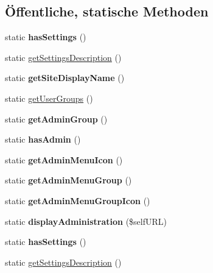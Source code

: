 \subsection*{Öffentliche, statische Methoden}
\begin{DoxyCompactItemize}
\item 
\mbox{\label{classdokumente_a0eaeb60df1f2a139f153f9806ef46004}} 
static {\bfseries has\+Settings} ()
\item 
static \mbox{\hyperlink{classdokumente_a541fbecd2c10b47527f7c5f5e5b61a33}{get\+Settings\+Description}} ()
\item 
\mbox{\label{classdokumente_a027f2367762ea75fab26b4765611efe1}} 
static {\bfseries get\+Site\+Display\+Name} ()
\item 
static \mbox{\hyperlink{classdokumente_a54e5fe41237e984537004709363d1e53}{get\+User\+Groups}} ()
\item 
\mbox{\label{classdokumente_a5f32d0a55dea942acedd77b93ec17572}} 
static {\bfseries get\+Admin\+Group} ()
\item 
\mbox{\label{classdokumente_a87c820043f95d979dadb12df37c6c44b}} 
static {\bfseries has\+Admin} ()
\item 
\mbox{\label{classdokumente_a4a633fa1d351f9b121422fe59775895a}} 
static {\bfseries get\+Admin\+Menu\+Icon} ()
\item 
\mbox{\label{classdokumente_a310bf52aab4832fa76440e20632ab32b}} 
static {\bfseries get\+Admin\+Menu\+Group} ()
\item 
\mbox{\label{classdokumente_a0e3005f5915d6123673b2793d0d58fcb}} 
static {\bfseries get\+Admin\+Menu\+Group\+Icon} ()
\item 
\mbox{\label{classdokumente_afa14a60627d087914d7b97241641ebd4}} 
static {\bfseries display\+Administration} (\$self\+U\+RL)
\item 
\mbox{\label{classdokumente_a0eaeb60df1f2a139f153f9806ef46004}} 
static {\bfseries has\+Settings} ()
\item 
static \mbox{\hyperlink{classdokumente_a541fbecd2c10b47527f7c5f5e5b61a33}{get\+Settings\+Description}} ()

\end{DoxyCompactItemize}
